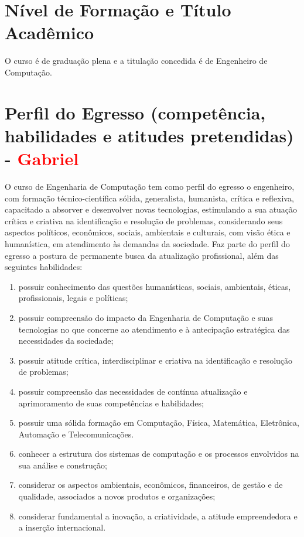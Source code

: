 \section{Nível de Formação e Título Acadêmico}

O curso é de graduação plena e a titulação concedida é de Engenheiro de Computação.

\section{Perfil do Egresso (competência, habilidades e atitudes pretendidas) - \textcolor{red}{Gabriel}}

O curso de Engenharia de Computação tem como perfil do egresso o engenheiro, com formação técnico-científica sólida, generalista, humanista, crítica e reflexiva, capacitado a absorver e desenvolver novas tecnologias, estimulando a sua atuação crítica e criativa na identificação e resolução de problemas, considerando seus aspectos políticos, econômicos, sociais, ambientais e culturais, com visão ética e humanística, em atendimento às demandas da sociedade. Faz parte do perfil do egresso a postura de permanente busca da atualização profissional, além das seguintes habilidades:
\begin{enumerate} [I -]
    \item possuir conhecimento das questões humanísticas, sociais, ambientais, éticas, profissionais, legais e políticas;
    \item possuir compreensão do impacto da Engenharia de Computação e suas tecnologias no que concerne ao atendimento e à antecipação estratégica das necessidades da sociedade;
    \item possuir atitude crítica, interdisciplinar e criativa na identificação e resolução de problemas;
    \item possuir compreensão das necessidades de contínua atualização e aprimoramento de suas competências e habilidades;
    \item possuir uma sólida formação em Computação, Física, Matemática, Eletrônica, Automação e Telecomunicações.
    \item conhecer a estrutura dos sistemas de computação e os processos envolvidos na sua análise e construção;
    \item considerar os aspectos ambientais, econômicos, financeiros, de gestão e de qualidade, associados a novos produtos e organizações;
    \item considerar fundamental a inovação, a criatividade, a atitude empreendedora e a inserção internacional.
\end{enumerate}


